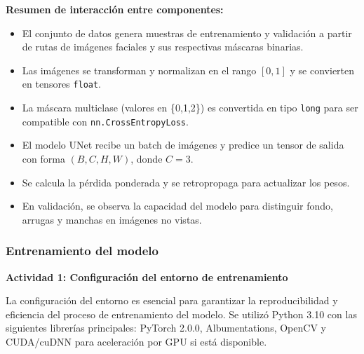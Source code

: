 \vspace{1em}
\textbf{Resumen de interacción entre componentes:}

\begin{itemize}
    \item El conjunto de datos genera muestras de entrenamiento y validación a partir de rutas de imágenes faciales y sus respectivas máscaras binarias.
    \item Las imágenes se transforman y normalizan en el rango \([0, 1]\) y se convierten en tensores \texttt{float}.
    \item La máscara multiclase (valores en \{0,1,2\}) es convertida en tipo \texttt{long} para ser compatible con \texttt{nn.CrossEntropyLoss}.
    \item El modelo UNet recibe un batch de imágenes y predice un tensor de salida con forma \((B, C, H, W)\), donde \(C = 3\).
    \item Se calcula la pérdida ponderada y se retropropaga para actualizar los pesos.
    \item En validación, se observa la capacidad del modelo para distinguir fondo, arrugas y manchas en imágenes no vistas.
\end{itemize}

\subsubsection{Entrenamiento del modelo}
\textbf{Actividad 1: Configuración del entorno de entrenamiento}

La configuración del entorno es esencial para garantizar la reproducibilidad y eficiencia del proceso de entrenamiento del modelo. Se utilizó Python 3.10 con las siguientes librerías principales: PyTorch 2.0.0, Albumentations, OpenCV y CUDA/cuDNN para aceleración por GPU si está disponible.

